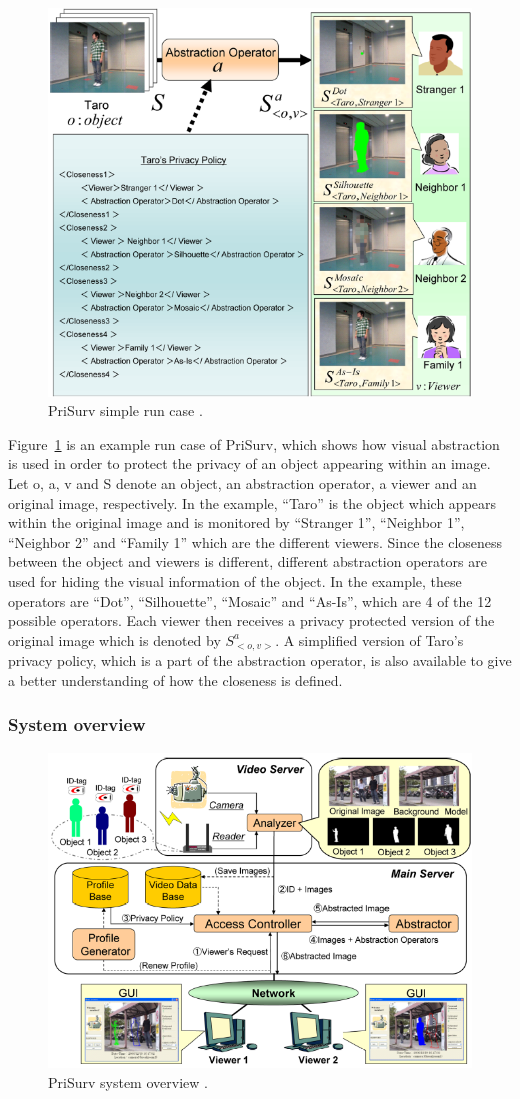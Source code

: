\documentclass[conference]{IEEEtran}
\begin{document}
\begin{figure}[t]
\centerline{\includegraphics[width=.5\textwidth]{img//prisurv_simple_demo.png}}
\caption{PriSurv simple run case \cite{chinomi2008PriSurv}.}
\label{fig:prisurv}
\end{figure}

Figure~\ref{fig:prisurv} is an example run case of PriSurv, which shows how visual abstraction is used in order to protect the privacy of an object appearing within an image. Let o, a, v and S denote an object, an abstraction operator, a viewer and an original image, respectively. In the example, “Taro” is the object which appears within the original image and is monitored by “Stranger 1”, “Neighbor 1”, “Neighbor 2” and “Family 1” which are the different viewers. Since the closeness between the object and viewers is different, different abstraction operators are used for hiding the visual information of the object. In the example, these operators are “Dot”, “Silhouette”, “Mosaic” and “As-Is”, which are 4 of the 12 possible operators. Each viewer then receives a privacy protected version of the original image which is denoted by $S_{<o, v>}^a$. A simplified version of Taro’s privacy policy, which is a part of the abstraction operator, is also available to give a better understanding of how the closeness is defined. 

\subsubsection{System overview}

\begin{figure}[t]
\centerline{\includegraphics[width=.5\textwidth]{img//prisurv_arch.png}}
\caption{PriSurv system overview \cite{chinomi2008PriSurv}.}
\label{fig:prisurv2}
\end{figure}
\end{document}
